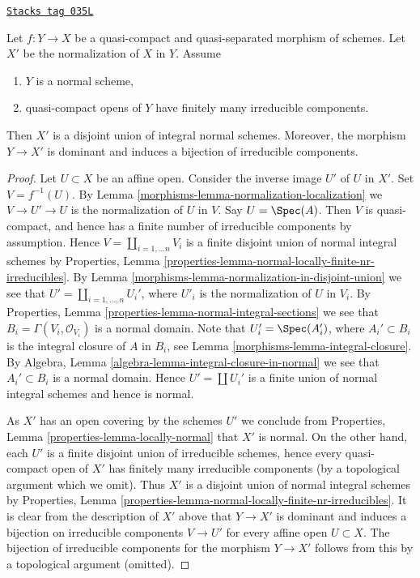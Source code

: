 \begin{lemma}
\label{morphisms-lemma-normal-normalization}
\href{https://stacks.math.columbia.edu/tag/035L}{\texttt{Stacks tag 035L}}

Let $f : Y \to X$ be a quasi-compact and quasi-separated morphism
of schemes. Let $X'$ be the normalization of $X$ in $Y$. Assume
\begin{enumerate}
\item $Y$ is a normal scheme,
\item quasi-compact opens of $Y$ have finitely many irreducible components.
\end{enumerate}
Then $X'$ is a disjoint union of integral normal schemes. Moreover,
the morphism $Y \to X'$ is dominant and induces a bijection of
irreducible components.
\end{lemma}

\begin{proof}

Let $U \subset X$ be an affine open. Consider the
inverse image $U'$ of $U$ in $X'$.
Set $V = f^{-1}(U)$. By Lemma \ref{morphisms-lemma-normalization-localization}
we $V \to U' \to U$ is the normalization of $U$ in $V$. Say
$U = \Spec(A)$. Then $V$ is quasi-compact, and hence has a finite number of
irreducible components by assumption. Hence
$V = \coprod_{i = 1, \ldots n} V_i$ is a finite disjoint union of
normal integral schemes by
Properties, Lemma \ref{properties-lemma-normal-locally-finite-nr-irreducibles}.
By Lemma \ref{morphisms-lemma-normalization-in-disjoint-union}
we see that $U' = \coprod_{i = 1, \ldots, n} U_i'$,
where $U'_i$ is the normalization of $U$ in $V_i$.
By Properties, Lemma \ref{properties-lemma-normal-integral-sections}
we see that $B_i = \Gamma(V_i, \mathcal{O}_{V_i})$ is a normal domain.
Note that $U_i' = \Spec(A_i')$, where $A_i' \subset B_i$
is the integral closure of $A$ in $B_i$, see
Lemma \ref{morphisms-lemma-integral-closure}. By
Algebra, Lemma \ref{algebra-lemma-integral-closure-in-normal}
we see that $A_i' \subset B_i$ is a normal domain.
Hence $U' = \coprod U_i'$ is a finite union of normal integral schemes
and hence is normal.

\medskip\noindent
As $X'$ has an open covering by the schemes $U'$ we conclude from
Properties, Lemma \ref{properties-lemma-locally-normal} that $X'$ is normal.
On the other hand, each $U'$ is a finite disjoint union of irreducible
schemes, hence every quasi-compact open of $X'$ has finitely many irreducible
components (by a topological argument which we omit). Thus $X'$
is a disjoint union of normal integral schemes by
Properties, Lemma \ref{properties-lemma-normal-locally-finite-nr-irreducibles}.
It is clear from the description of $X'$ above that $Y \to X'$
is dominant and induces a bijection on irreducible components
$V \to U'$ for every affine open $U \subset X$. The bijection of
irreducible components for the morphism $Y \to X'$
follows from this by a topological argument (omitted).
\end{proof}

